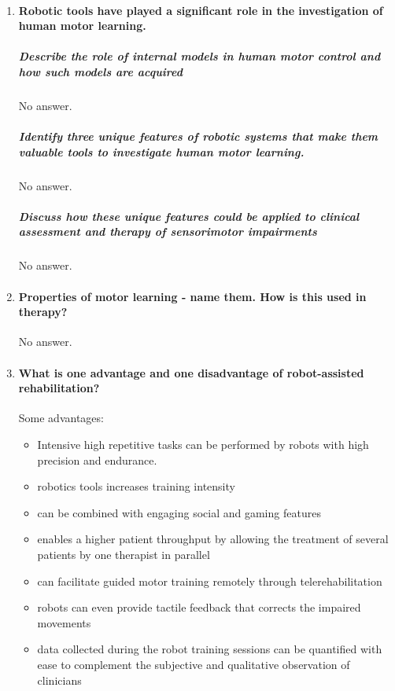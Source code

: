 \documentclass[12pt,article,oneside,a4paper]{memoir}
\begin{document}
\begin{enumerate}
\item \paragraph{Robotic tools have played a significant role in the investigation of human motor learning.}

\subparagraph{Describe the role of internal models in human motor control and
how such models are acquired}
No answer.

\subparagraph{Identify three unique features of robotic systems that make them
valuable tools to investigate human motor learning.}
No answer.

\subparagraph{Discuss how these unique features could be applied to clinical
assessment and therapy of sensorimotor impairments} 
No answer.

\item \paragraph{Properties of motor learning - name them.  How is this used in therapy?}
No answer.

\item \paragraph{What is one advantage and one disadvantage of robot-assisted
rehabilitation?}
Some advantages:
\begin{itemize}
\item Intensive high repetitive tasks can be performed by robots with high
precision and endurance.
\item robotics tools increases training intensity
\item can be combined with engaging social and gaming features
\item enables a higher patient throughput by allowing the treatment of several
patients by one therapist in parallel
\item can facilitate guided motor training remotely through telerehabilitation
\item robots can even provide tactile feedback that corrects the impaired
movements
\item data collected during the robot training sessions can be quantified with
ease to complement the subjective and qualitative observation of clinicians
\end{itemize}


\end{enumerate}
\end{document}
